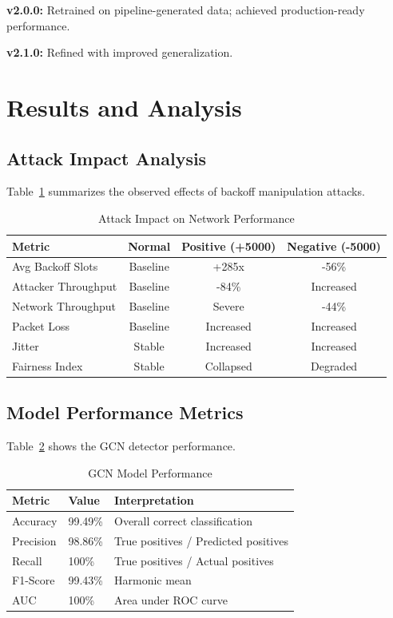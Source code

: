 \documentclass[12pt,a4paper]{article}
\begin{document}
\textbf{v2.0.0:} Retrained on pipeline-generated data; achieved production-ready performance.

\textbf{v2.1.0:} Refined with improved generalization.

\section{Results and Analysis}

\subsection{Attack Impact Analysis}

Table~\ref{tab:attack} summarizes the observed effects of backoff manipulation attacks.

\begin{table}[htbp]
\centering
\caption{Attack Impact on Network Performance}
\label{tab:attack}
\begin{tabular}{@{}lccc@{}}
\toprule
\textbf{Metric} & \textbf{Normal} & \textbf{Positive (+5000)} & \textbf{Negative (-5000)} \\
\midrule
Avg Backoff Slots & Baseline & +285x & -56\% \\
Attacker Throughput & Baseline & -84\% & Increased \\
Network Throughput & Baseline & Severe & -44\% \\
Packet Loss & Baseline & Increased & Increased \\
Jitter & Stable & Increased & Increased \\
Fairness Index & Stable & Collapsed & Degraded \\
\bottomrule
\end{tabular}
\end{table}

\subsection{Model Performance Metrics}

Table~\ref{tab:performance} shows the GCN detector performance.

\begin{table}[htbp]
\centering
\caption{GCN Model Performance}
\label{tab:performance}
\begin{tabular}{@{}lll@{}}
\toprule
\textbf{Metric} & \textbf{Value} & \textbf{Interpretation} \\
\midrule
Accuracy & 99.49\% & Overall correct classification \\
Precision & 98.86\% & True positives / Predicted positives \\
Recall & 100\% & True positives / Actual positives \\
F1-Score & 99.43\% & Harmonic mean \\
AUC & 100\% & Area under ROC curve \\
\bottomrule
\end{tabular}
\end{table}
\end{document}
